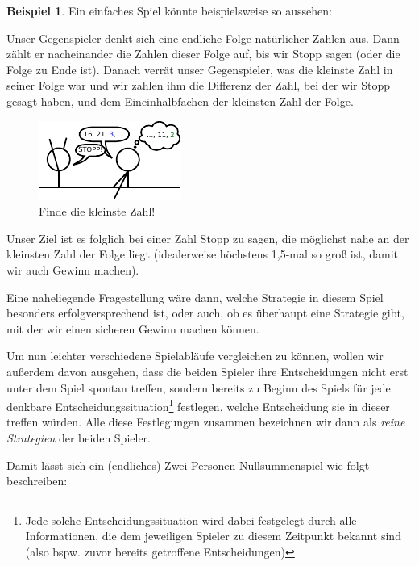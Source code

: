 \documentclass[a4paper,ngerman,12pt,bibtotoc]{scrartcl}
\theoremstyle{definition}
\newtheorem{bsp}[defn]{Beispiel}
\theoremstyle{plain}
\theoremstyle{remark}
\renewcommand{\_}{\mathpunct{.}\,}
\newcommand{\?}{\,{:}\,}
\newcommand{\ZPNS}{Zwei-Personen-Nullsummenspiel }
\begin{document}
	\begin{bsp}\label{bsp:teil1}
		Ein einfaches Spiel könnte beispielsweise so aussehen: 
		
		Unser Gegenspieler denkt sich eine endliche Folge natürlicher Zahlen aus. Dann zählt er nacheinander die Zahlen dieser Folge auf, bis wir \glqq Stopp\grqq{} sagen (oder die Folge zu Ende ist). Danach verrät unser Gegenspieler, was die kleinste Zahl in seiner Folge war und wir zahlen ihm die Differenz der Zahl, bei der wir \glqq Stopp\grqq{} gesagt haben, und dem Eineinhalbfachen der kleinsten Zahl der Folge.
		
		\begin{figure}[h]
			\centering
			\includegraphics[width=0.45\linewidth]{../Bilder/Comic}
			\caption{\small Finde die kleinste Zahl!}
			\label{fig:Comic}
		\end{figure}

		
		Unser Ziel ist es folglich bei einer Zahl \glqq Stopp\grqq{} zu sagen, die möglichst nahe an der kleinsten Zahl der Folge liegt (idealerweise höchstens 1,5-mal so groß ist, damit wir auch Gewinn machen).
		
		Eine naheliegende Fragestellung wäre dann, welche Strategie in diesem Spiel besonders erfolgversprechend ist, oder auch, ob es überhaupt eine Strategie gibt, mit der wir einen sicheren Gewinn machen können.
	\end{bsp}
	
	Um nun leichter verschiedene Spielabläufe vergleichen zu können, wollen wir außerdem davon ausgehen, dass die beiden Spieler ihre Entscheidungen nicht erst unter dem Spiel \glqq spontan\grqq{} treffen, sondern bereits zu Beginn des Spiels für jede denkbare Entscheidungssituation\footnote{Jede solche Entscheidungssituation wird dabei festgelegt durch alle Informationen, die dem jeweiligen Spieler zu diesem Zeitpunkt bekannt sind (also bspw. zuvor bereits getroffene Entscheidungen)} festlegen, welche Entscheidung sie in dieser treffen würden. Alle diese Festlegungen zusammen bezeichnen wir dann als \emph{reine Strategien} der beiden Spieler.
	
	Damit lässt sich ein (endliches) \ZPNS wie folgt beschreiben:
	
\end{document}
